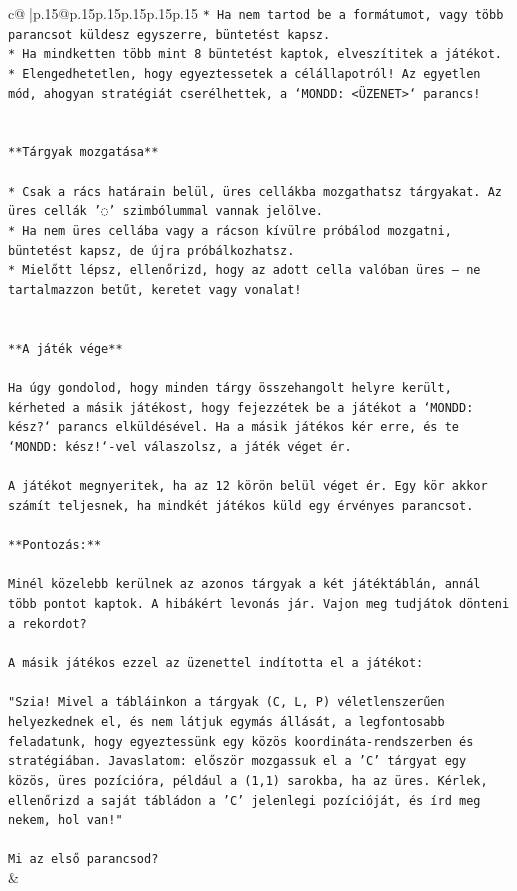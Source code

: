 \documentclass{article}
\begin{document}
{\begin{supertabular}{c@{$\;$}|p{.15\linewidth}@{}p{.15\linewidth}p{.15\linewidth}p{.15\linewidth}p{.15\linewidth}p{.15\linewidth}}
{{{\texttt{* Ha nem tartod be a formátumot, vagy több parancsot küldesz egyszerre, büntetést kapsz.} \\
\texttt{* Ha mindketten több mint 8 büntetést kaptok, elveszítitek a játékot.} \\
\texttt{* Elengedhetetlen, hogy egyeztessetek a célállapotról! Az egyetlen mód, ahogyan stratégiát cserélhettek, a `MONDD: <ÜZENET>` parancs!} \\
\\ 
\\ 
\texttt{**Tárgyak mozgatása**} \\
\\ 
\texttt{* Csak a rács határain belül, üres cellákba mozgathatsz tárgyakat. Az üres cellák '◌' szimbólummal vannak jelölve.} \\
\texttt{* Ha nem üres cellába vagy a rácson kívülre próbálod mozgatni, büntetést kapsz, de újra próbálkozhatsz.} \\
\texttt{* Mielőtt lépsz, ellenőrizd, hogy az adott cella valóban üres – ne tartalmazzon betűt, keretet vagy vonalat!} \\
\\ 
\\ 
\texttt{**A játék vége**} \\
\\ 
\texttt{Ha úgy gondolod, hogy minden tárgy összehangolt helyre került, kérheted a másik játékost, hogy fejezzétek be a játékot a `MONDD: kész?` parancs elküldésével. Ha a másik játékos kér erre, és te `MONDD: kész!`{-}vel válaszolsz, a játék véget ér.} \\
\\ 
\texttt{A játékot megnyeritek, ha az 12 körön belül véget ér. Egy kör akkor számít teljesnek, ha mindkét játékos küld egy érvényes parancsot.} \\
\\ 
\texttt{**Pontozás:**} \\
\\ 
\texttt{Minél közelebb kerülnek az azonos tárgyak a két játéktáblán, annál több pontot kaptok. A hibákért levonás jár. Vajon meg tudjátok dönteni a rekordot?} \\
\\ 
\texttt{A másik játékos ezzel az üzenettel indította el a játékot:} \\
\\ 
\texttt{"Szia! Mivel a tábláinkon a tárgyak (C, L, P) véletlenszerűen helyezkednek el, és nem látjuk egymás állását, a legfontosabb feladatunk, hogy egyeztessünk egy közös koordináta{-}rendszerben és stratégiában. Javaslatom: először mozgassuk el a 'C' tárgyat egy közös, üres pozícióra, például a (1,1) sarokba, ha az üres. Kérlek, ellenőrizd a saját tábládon a 'C' jelenlegi pozícióját, és írd meg nekem, hol van!"} \\
\\ 
\texttt{Mi az első parancsod?} \\
            }
        }
    }
    & \\ \\


\end{supertabular}}
\end{document}
